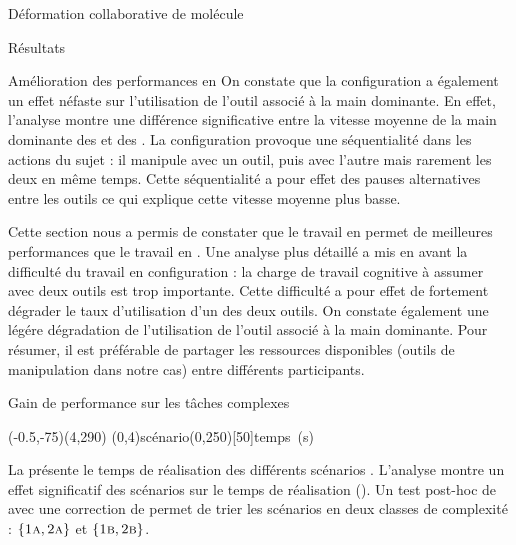\documentclass[myfrancais]{mythesis}
\begin{document}
\begin{mychapter}{Déformation collaborative de molécule}
\begin{mysection}{Résultats}
\begin{mysubsection}{Amélioration des performances en }
				On constate que la configuration  a également un effet néfaste sur l'utilisation de l'outil associé à la main dominante.
				En effet, l'analyse montre une différence significative entre la vitesse moyenne de la main dominante des  et des .
				La configuration  provoque une séquentialité dans les actions du sujet : il manipule avec un outil, puis avec l'autre mais rarement les deux en même temps.
				Cette séquentialité a pour effet des pauses alternatives entre les outils ce qui explique cette vitesse moyenne plus basse.

				Cette section nous a permis de constater que le travail en  permet de meilleures performances que le travail en .
				Une analyse plus détaillé a mis en avant la difficulté du travail en configuration  : la charge de travail cognitive à assumer avec deux outils est trop importante.
				Cette difficulté a pour effet de fortement dégrader le taux d'utilisation d'un des deux outils.
				On constate également une légére dégradation de l'utilisation de l'outil associé à la main dominante.
				Pour résumer, il est préférable de partager les ressources disponibles (outils de manipulation dans notre cas) entre différents participants.
			\end{mysubsection}
			\begin{mysubsection}{Gain de performance sur les tâches complexes}
				\begin{myfigure}
					\begin{myps}(-0.5,-75)(4,290)
						\myaxes(0,4){scénario}(0,250)[50]{temps~(s)}
					\end{myps}
				\end{myfigure}

				La  présente le temps de réalisation  des différents scénarios .
				L'analyse montre un effet significatif des scénarios  sur le temps de réalisation  ().
				Un test post-hoc de  avec une correction de  permet de trier les scénarios en deux classes de complexité : $\left\{\textsc{1a}, \textsc{2a}\right\}$ et $\left\{\textsc{1b}, \textsc{2b}\right\}$.


\end{mysubsection}
\end{mysection}
\end{mychapter}
\end{document}
